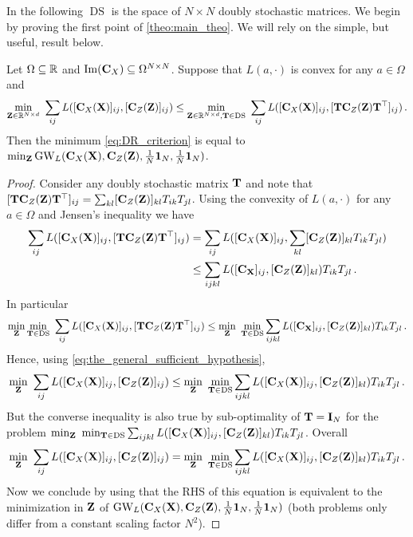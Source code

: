 In the following $\operatorname{DS}$ is the space of $N \times N$ doubly stochastic matrices. We begin by proving the first point of \cref{theo:main_theo}. We will rely on the simple, but useful, result below.
\begin{proposition}
	\label{proposition:general_sufficient_condition}
	Let $\Omega \subseteq \mathbb{R}$ and $\operatorname{Im}({\mathbf{C}}_{X}) \subseteq \Omega^{N \times N}$. Suppose that $L(a, \cdot)$ is convex for any $a \in \Omega$ and
	\begin{equation}
		\label{eq:the_general_sufficient_hypothesis}
		\min_{\mZ \in \R^{N \times d}} \ \sum_{ij} L([\simiX(\mX)]_{ij}, [\simi(\mZ)]_{ij}) \leq \min_{\mZ \in \R^{N \times d}, \mT \in \DS} \ \sum_{ij} L([\simiX(\mX)]_{ij}, [\mT \simi(\mZ) \mT^\top]_{ij})\,.
	\end{equation}
	Then the minimum \cref{eq:DR_criterion} is equal to $\min_{{\mathbf{Z}}}\operatorname{GW}_L({\mathbf{C}}_{X}({\mathbf{X}}), {\mathbf{C}}_{Z}({\mathbf{Z}}), \frac{1}{N}\bm{1}_N, \frac{1}{N}\bm{1}_N)$.
\end{proposition}
\begin{proof}
	Consider any doubly stochastic matrix ${\mathbf{T}}$ and note that $[{\mathbf{T}} {\mathbf{C}}_{Z}({\mathbf{Z}}) {\mathbf{T}}^\top]_{ij} = \sum_{kl} [{\mathbf{C}}_{Z}({\mathbf{Z}})]_{kl} T_{ik} T_{jl}$. Using the convexity of $L(a, \cdot)$ for any $a \in \Omega$ and Jensen's inequality we have
	\begin{equation}
		\begin{split}
			\label{eq:jensenagain}
			\sum_{ij} L([{\mathbf{C}}_{X}({\mathbf{X}})]_{ij}, [{\mathbf{T}} {\mathbf{C}}_{Z}({\mathbf{Z}}) {\mathbf{T}}^\top]_{ij}) &= \sum_{ij} L([{\mathbf{C}}_{X}({\mathbf{X}})]_{ij}, \sum_{kl} [{\mathbf{C}}_{Z}({\mathbf{Z}})]_{kl} T_{ik} T_{jl})\\
			&\leq \sum_{ijkl} L([{\mathbf{C}}_{\mathbf{X}}]_{ij}, [{\mathbf{C}}_{Z}({\mathbf{Z}})]_{kl}) T_{ik} T_{jl}\,.
		\end{split}
	\end{equation}
	In particular
	\begin{equation}
		\min_{\mZ} \min_{\mT \in \DS} \ \sum_{ij} L([\simiX(\mX)]_{ij}, [\mT \simi(\mZ) \mT^\top]_{ij}) \leq \min_{\mZ} \ \min_{\mT \in \DS} \sum_{ijkl} L([\mC_\mX]_{ij}, [\simi(\mZ)]_{kl}) T_{ik} T_{jl} \,.
	\end{equation}
	Hence, using \cref{eq:the_general_sufficient_hypothesis},
	\begin{equation}
		\min_{{\mathbf{Z}}} \ \sum_{ij} L([{\mathbf{C}}_{X}({\mathbf{X}})]_{ij}, [{\mathbf{C}}_{Z}({\mathbf{Z}})]_{ij}) \leq \min_{{\mathbf{Z}}} \ \min_{{\mathbf{T}} \in \operatorname{DS}} \sum_{ijkl} L([{\mathbf{C}}_{X}({\mathbf{X}})]_{ij}, [{\mathbf{C}}_{Z}({\mathbf{Z}})]_{kl}) T_{ik} T_{jl}\,.
	\end{equation}
	But the converse inequality is also true by sub-optimality of ${\mathbf{T}} = {\mathbf{I}}_N$ for the problem $\min_{{\mathbf{Z}}} \ \min_{{\mathbf{T}} \in \operatorname{DS}} \sum_{ijkl} L([{\mathbf{C}}_{X}({\mathbf{X}})]_{ij}, [{\mathbf{C}}_{Z}({\mathbf{Z}})]_{kl}) T_{ik} T_{jl}$. Overall 
	\begin{equation}
		\min_{\mZ} \ \sum_{ij} L([\simiX(\mX)]_{ij}, [\simi(\mZ)]_{ij}) = \min_{\mZ} \ \min_{\mT \in \DS} \sum_{ijkl} L([\simiX(\mX)]_{ij}, [\simi(\mZ)]_{kl}) T_{ik} T_{jl}\,.
	\end{equation}
	Now we conclude by using that the RHS of this equation is equivalent to the minimization in ${\mathbf{Z}}$ of $\operatorname{GW}_L({\mathbf{C}}_{X}({\mathbf{X}}), {\mathbf{C}}_{Z}({\mathbf{Z}}), \frac{1}{N}\bm{1}_N, \frac{1}{N}\bm{1}_N)$ (both problems only differ from a constant scaling factor $N^2$).
\end{proof}

